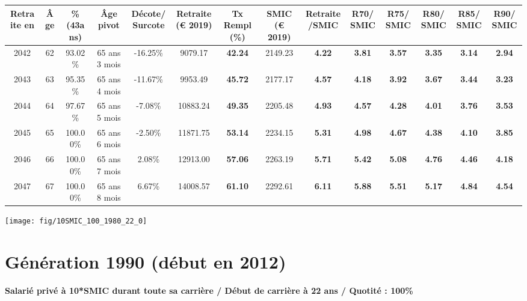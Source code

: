 \begin{adjustbox}{max width=\textwidth} 
\begin{tabular}[htb]{|c|c||c|c|c||c|c||c|c||c|c|c|c|c|} 
\hline 
 Retraite en &  Âge &  \%(43ans) &  Âge pivot &  Décote/Surcote &  Retraite (\euro{} 2019) &  Tx Rempl(\%) &  SMIC (\euro{} 2019) &  Retraite/SMIC &  R70/SMIC &  R75/SMIC &  R80/SMIC &  R85/SMIC &  R90/SMIC \\ 
\hline \hline 
 2042 &  62 &  93.02\% &  65 ans 3 mois &  -16.25\% &  9079.17 &  {\bf 42.24} &  2149.23 &  {\bf 4.22} &  {\bf 3.81} &  {\bf 3.57} &  {\bf 3.35} &  {\bf 3.14} &  {\bf 2.94} \\ 
\hline 
 2043 &  63 &  95.35\% &  65 ans 4 mois &  -11.67\% &  9953.49 &  {\bf 45.72} &  2177.17 &  {\bf 4.57} &  {\bf 4.18} &  {\bf 3.92} &  {\bf 3.67} &  {\bf 3.44} &  {\bf 3.23} \\ 
\hline 
 2044 &  64 &  97.67\% &  65 ans 5 mois &  -7.08\% &  10883.24 &  {\bf 49.35} &  2205.48 &  {\bf 4.93} &  {\bf 4.57} &  {\bf 4.28} &  {\bf 4.01} &  {\bf 3.76} &  {\bf 3.53} \\ 
\hline 
 2045 &  65 &  100.00\% &  65 ans 6 mois &  -2.50\% &  11871.75 &  {\bf 53.14} &  2234.15 &  {\bf 5.31} &  {\bf 4.98} &  {\bf 4.67} &  {\bf 4.38} &  {\bf 4.10} &  {\bf 3.85} \\ 
\hline 
 2046 &  66 &  100.00\% &  65 ans 7 mois &  2.08\% &  12913.00 &  {\bf 57.06} &  2263.19 &  {\bf 5.71} &  {\bf 5.42} &  {\bf 5.08} &  {\bf 4.76} &  {\bf 4.46} &  {\bf 4.18} \\ 
\hline 
 2047 &  67 &  100.00\% &  65 ans 8 mois &  6.67\% &  14008.57 &  {\bf 61.10} &  2292.61 &  {\bf 6.11} &  {\bf 5.88} &  {\bf 5.51} &  {\bf 5.17} &  {\bf 4.84} &  {\bf 4.54} \\ 
\hline 
\hline 
\end{tabular} 
\end{adjustbox} 
 
 \vspace{0.1cm} 

 {\hspace{-2.2cm}\texttt{[image: fig/10SMIC\_100\_1980\_22\_0]}} 

\newpage 
 
\section{Génération 1990 (début en 2012)\label{10SMIC_100_1990_22_0}} 
 
{\bf \noindent Salarié privé à 10*SMIC durant toute sa carrière / Début de carrière à 22 ans / Quotité : 100\%}  ~ 

